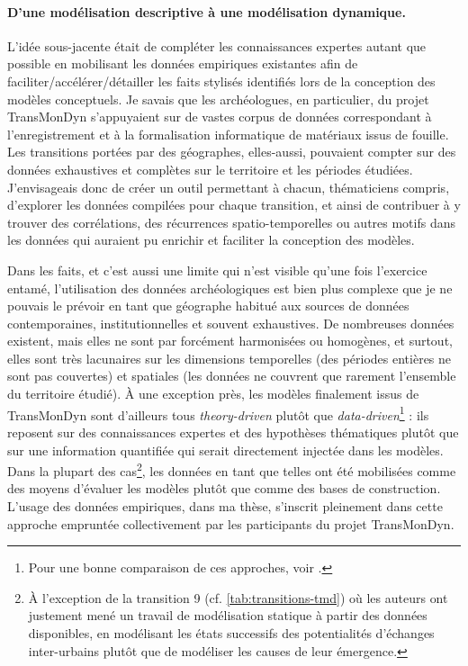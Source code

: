 \paragraph{D'une modélisation descriptive à une modélisation dynamique.}

L'idée sous-jacente était de compléter les connaissances expertes autant que possible en mobilisant les données empiriques existantes afin de faciliter/accélérer/détailler les faits stylisés identifiés lors de la conception des modèles conceptuels.
Je savais que les archéologues, en particulier, du projet TransMonDyn s'appuyaient sur de vastes corpus de données correspondant à l'enregistrement et à la formalisation informatique de matériaux issus de fouille.
Les transitions portées par des géographes, elles-aussi, pouvaient compter sur des données exhaustives et complètes sur le territoire et les périodes étudiées.
J'envisageais donc de créer un outil permettant à chacun, thématiciens compris, d'explorer les données compilées pour chaque transition, et ainsi de contribuer à y trouver des corrélations, des récurrences spatio-temporelles ou autres motifs dans les données qui auraient pu enrichir et faciliter la conception des modèles.

Dans les faits, et c'est aussi une limite qui n'est visible qu'une fois l'exercice entamé, l'utilisation des données archéologiques est bien plus complexe que je ne pouvais le prévoir en tant que géographe habitué aux sources de données contemporaines, institutionnelles et souvent exhaustives.
De nombreuses \og données\fg{} existent, mais elles ne sont par forcément harmonisées ou homogènes, et surtout, elles sont très lacunaires sur les dimensions temporelles (des périodes entières ne sont pas couvertes) et spatiales (les données ne couvrent que rarement l'ensemble du territoire étudié).
À une exception près, les modèles finalement issus de TransMonDyn sont d'ailleurs tous \og \textit{theory-driven}\fg{} plutôt que \og \textit{data-driven}\fg{}\footnote{
	Pour une bonne comparaison de ces approches, voir \textcite[120--122]{mathian_objets_2014}.
} :
	ils reposent sur des connaissances expertes et des hypothèses thématiques plutôt que sur une information quantifiée qui serait directement injectée dans les modèles.
Dans la plupart des cas\footnote{
	À l'exception de la transition 9 (cf. \cref{tab:transitions-tmd}) où les auteurs \autocite{bretagnolle_transition_2017} ont justement mené un travail de modélisation \og statique\fg{} à partir des données disponibles, en modélisant les états successifs des potentialités d'échanges inter-urbains plutôt que de modéliser les causes de leur émergence. 
}, les données en tant que telles ont été mobilisées comme des moyens d'évaluer les modèles plutôt que comme des bases de construction.
L'usage des données empiriques, dans ma thèse, s'inscrit pleinement dans cette approche empruntée collectivement par les participants du projet TransMonDyn.

